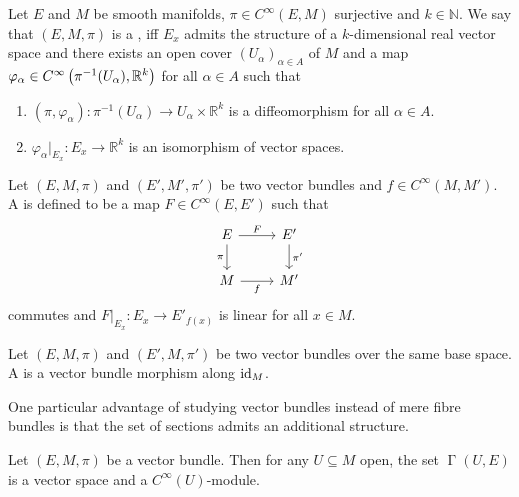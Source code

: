 \begin{definition}
	Let $E$ and $M$ be smooth manifolds, $\pi \in C^\infty(E,M)$ surjective and $k \in \mathbb{N}$. We say that $(E,M,\pi)$ is a , iff $E_x$ admits the structure of a $k$-dimensional real vector space and there exists an open cover $(U_\alpha)_{\alpha \in A}$ of $M$ and a map $\varphi_\alpha \in C^\infty\del[1]{\pi^{-1}(U_\alpha),\mathbb{R}^k}$ for all $\alpha \in A$ such that
	\begin{enumerate}[label = \textup{(\roman*)},leftmargin=*]
		\item $(\pi,\varphi_\alpha) : \pi^{-1}(U_\alpha) \to U_\alpha \times \mathbb{R}^k$ is a diffeomorphism for all $\alpha \in A$.
		\item $\varphi_\alpha\vert_{E_x} : E_x \to \mathbb{R}^k$ is an isomorphism of vector spaces.
	\end{enumerate}
\end{definition}

\begin{definition}
	Let $(E,M,\pi)$ and $(E',M',\pi')$ be two vector bundles and $f \in C^\infty(M,M')$. A  is defined to be a map $F \in C^\infty(E,E')$ such that 
	\begin{equation*}
		\begin{tikzcd}
			E \arrow[d,"\pi"']\arrow[r,"F"] & E'\arrow[d,"\pi'"]\\
			M \arrow[r,"f"'] & M'
		\end{tikzcd}
	\end{equation*}
	\noindent commutes and $F\vert_{E_x} : E_x \to E'_{f(x)}$ is linear for all $x \in M$.
\end{definition}

\begin{definition}
	Let $(E,M,\pi)$ and $(E',M,\pi')$ be two vector bundles	over the same base space. A  is a vector bundle morphism along $\operatorname{id}_M$.
\end{definition}

One particular advantage of studying vector bundles instead of mere fibre bundles is that the set of sections admits an additional structure.

\begin{lemma}
	Let $(E,M,\pi)$ be a vector bundle. Then for any $U \subseteq M$ open, the set $\upGamma(U,E)$ is a vector space and a $C^\infty(U)$-module. 
\end{lemma}
